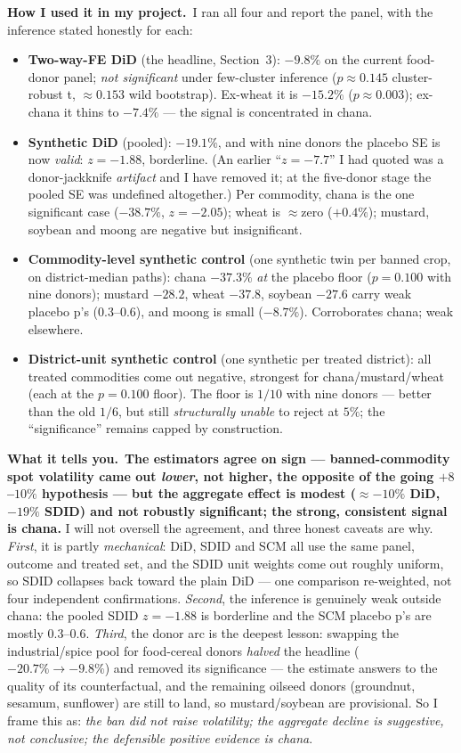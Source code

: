 \documentclass[11pt]{article}
\newcommand{\applied}{\smallskip\noindent\textbf{How I used it in my project.}\ }
\newcommand{\tells}{\smallskip\noindent\textbf{What it tells you.}\ }
\begin{document}
\applied I ran all four and report the panel, with the inference stated honestly for each:
\begin{itemize}
\item \textbf{Two-way-FE DiD} (the headline, Section~3): $-9.8\%$ on the current food-donor panel;
\emph{not significant} under few-cluster inference ($p\approx0.145$ cluster-robust t,
$\approx0.153$ wild bootstrap). Ex-wheat it is $-15.2\%$ ($p\approx0.003$); ex-chana it thins to
$-7.4\%$ --- the signal is concentrated in chana.
\item \textbf{Synthetic DiD} (pooled): $-19.1\%$, and with nine donors the placebo SE is now
\emph{valid}: $z=-1.88$, borderline. (An earlier ``$z=-7.7$'' I had quoted was a donor-jackknife
\emph{artifact} and I have removed it; at the five-donor stage the pooled SE was undefined
altogether.) Per commodity, chana is the one significant case ($-38.7\%$, $z=-2.05$); wheat is
$\approx$zero ($+0.4\%$); mustard, soybean and moong are negative but insignificant.
\item \textbf{Commodity-level synthetic control} (one synthetic twin per banned crop, on
district-median paths): chana $-37.3\%$ \emph{at} the placebo floor ($p=0.100$ with nine donors);
mustard $-28.2$, wheat $-37.8$, soybean $-27.6$ carry weak placebo p's ($0.3$--$0.6$), and moong is
small ($-8.7\%$). Corroborates chana; weak elsewhere.
\item \textbf{District-unit synthetic control} (one synthetic per treated district): all treated
commodities come out negative, strongest for chana/mustard/wheat (each at the $p=0.100$ floor).
The floor is $1/10$ with nine donors --- better than the old $1/6$, but still \emph{structurally
unable} to reject at $5\%$; the ``significance'' remains capped by construction.
\end{itemize}

\tells \textbf{The estimators agree on sign --- banned-commodity spot volatility came out
\emph{lower}, not higher, the opposite of the going $+8$--$10\%$ hypothesis --- but the aggregate
effect is modest ($\approx-10\%$ DiD, $-19\%$ SDID) and not robustly significant; the strong,
consistent signal is chana.} I will not oversell the agreement, and three honest caveats are why.
\emph{First}, it is partly \emph{mechanical}: DiD, SDID and SCM all use the same panel, outcome and
treated set, and the SDID unit weights come out roughly uniform, so SDID collapses back toward the
plain DiD --- one comparison re-weighted, not four independent confirmations. \emph{Second}, the
inference is genuinely weak outside chana: the pooled SDID $z=-1.88$ is borderline and the SCM
placebo p's are mostly $0.3$--$0.6$. \emph{Third}, the donor arc is the deepest lesson: swapping the
industrial/spice pool for food-cereal donors \emph{halved} the headline ($-20.7\% \to -9.8\%$) and
removed its significance --- the estimate answers to the quality of its counterfactual, and the
remaining oilseed donors (groundnut, sesamum, sunflower) are still to land, so mustard/soybean are
provisional. So I frame this as: \emph{the ban did not raise volatility; the aggregate decline is
suggestive, not conclusive; the defensible positive evidence is chana}.
\end{document}
